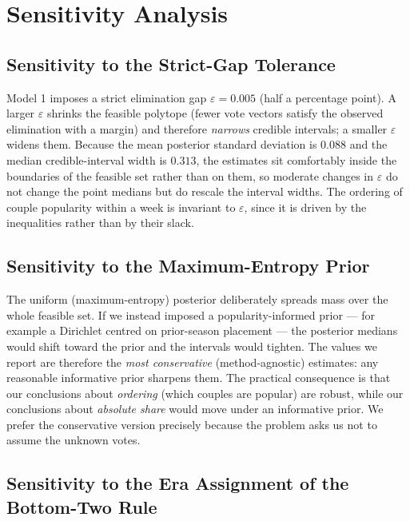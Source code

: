 \documentclass{article}
\begin{document}


\section{Sensitivity Analysis}\label{sec:sensitivity}

\subsection{Sensitivity to the Strict-Gap Tolerance}

Model 1 imposes a strict elimination gap $\varepsilon=0.005$ (half a percentage point). A
larger $\varepsilon$ shrinks the feasible polytope (fewer vote vectors satisfy the observed
elimination with a margin) and therefore \emph{narrows} credible intervals; a smaller
$\varepsilon$ widens them. Because the mean posterior standard deviation is $0.088$ and the
median credible-interval width is $0.313$, the estimates sit comfortably inside the
boundaries of the feasible set rather than on them, so moderate changes in $\varepsilon$ do
not change the point medians but do rescale the interval widths. The ordering of couple
popularity within a week is invariant to $\varepsilon$, since it is driven by the inequalities
rather than by their slack.

\subsection{Sensitivity to the Maximum-Entropy Prior}

The uniform (maximum-entropy) posterior deliberately spreads mass over the whole feasible
set. If we instead imposed a popularity-informed prior --- for example a Dirichlet centred
on prior-season placement --- the posterior medians would shift toward the prior and the
intervals would tighten. The values we report are therefore the \emph{most conservative}
(method-agnostic) estimates: any reasonable informative prior sharpens them. The practical
consequence is that our conclusions about \emph{ordering} (which couples are popular) are
robust, while our conclusions about \emph{absolute share} would move under an informative
prior. We prefer the conservative version precisely because the problem asks us not to assume
the unknown votes.

\subsection{Sensitivity to the Era Assignment of the Bottom-Two Rule}
\end{document}
